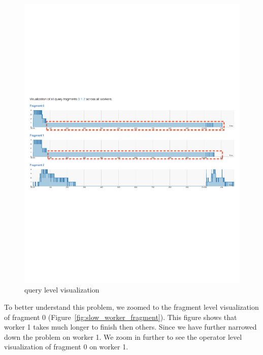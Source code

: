 \documentclass[11pt]{scrartcl}
\begin{document}
\begin{figure}[h]
  \begin{center}
    \includegraphics[width=\textwidth]{slow_worker_overview.pdf}
  \end{center}
  \caption{query level visualization}
  \label{fig:slow_worker_overview}
\end{figure}

To better understand this problem, we zoomed to the fragment level visualization of fragment 0 (Figure~\ref{fig:slow_worker_fragment}). This figure shows that worker 1 takes much longer to finish then others. Since we have further narrowed down the problem on worker 1. We zoom in further to see the operator level visualization of fragment 0 on worker 1.
\end{document}

